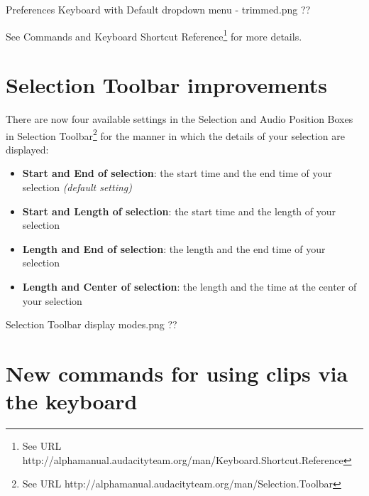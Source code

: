 

Preferences Keyboard with Default dropdown menu - trimmed.png
??

See Commands and Keyboard Shortcut Reference\footnote{See URL http://alphamanual.audacityteam.org/man/Keyboard.Shortcut.Reference} for more details.




\section{
Selection Toolbar improvements
}


There are now four available settings in the Selection and Audio Position Boxes in Selection Toolbar\footnote{See URL http://alphamanual.audacityteam.org/man/Selection.Toolbar} for the  manner in which the details of your selection are displayed:
\begin{itemize}
\item \textbf{Start and End of selection}: the start time and the end time of your selection \textit{(default setting)}
\item \textbf{Start and Length of selection}: the start time and the length of your selection
\item \textbf{Length and End of selection}: the length and the end time of your selection
\item \textbf{Length and Center of selection}: the length and the time at the center of your selection
\end{itemize}

Selection Toolbar display modes.png
??





\section{
New commands for using clips via the keyboard
}


